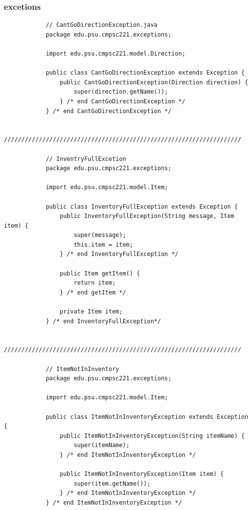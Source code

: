 \documentclass[a4paper, 11pt]{article}
\begin{document}
        \subsubsection{excetions}
            \begin{lstlisting}
            // CantGoDirectionException.java
            package edu.psu.cmpsc221.exceptions;

            import edu.psu.cmpsc221.model.Direction;

            public class CantGoDirectionException extends Exception {
                public CantGoDirectionException(Direction direction) {
                    super(direction.getName());
                } /* end CantGoDirectionException */
            } /* end CantGoDirectionException */

            ////////////////////////////////////////////////////////////////////

            // InventryFullExcetion
            package edu.psu.cmpsc221.exceptions;

            import edu.psu.cmpsc221.model.Item;

            public class InventoryFullException extends Exception {
                public InventoryFullException(String message, Item item) {
                    super(message);
                    this.item = item;
                } /* end InventoryFullException */

                public Item getItem() {
                    return item;
                } /* end getItem */

                private Item item;
            } /* end InventoryFullException*/

            ////////////////////////////////////////////////////////////////////

            // ItemNotInInventory
            package edu.psu.cmpsc221.exceptions;

            import edu.psu.cmpsc221.model.Item;

            public class ItemNotInInventoryException extends Exception {
                public ItemNotInInventoryException(String itemName) {
                    super(itemName);
                } /* end ItemNotInInventoryException */

                public ItemNotInInventoryException(Item item) {
                    super(item.getName());
                } /* end ItemNotInInventoryException */
            } /* end ItemNotInInventoryException */
            \end{lstlisting}
\end{document}
